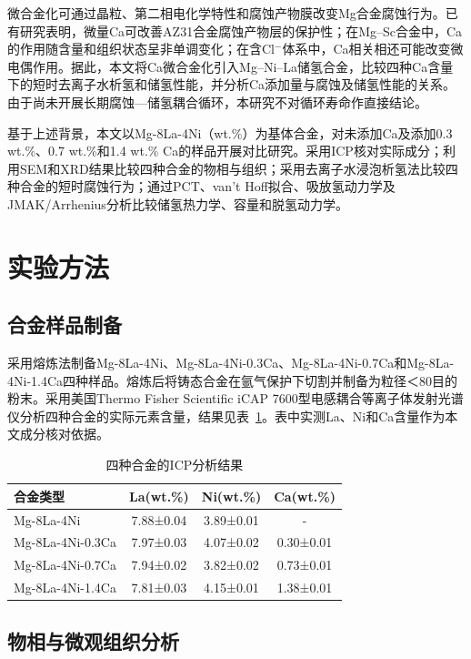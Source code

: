 \documentclass[preprint,12pt]{elsarticle}
\begin{document}
微合金化可通过晶粒、第二相电化学特性和腐蚀产物膜改变Mg合金腐蚀行为。已有研究表明，微量Ca可改善AZ31合金腐蚀产物层的保护性\cite{ref6}；在Mg–Sc合金中，Ca的作用随含量和组织状态呈非单调变化\cite{ref7}；在含Cl$^-$体系中，Ca相关相还可能改变微电偶作用\cite{ref8}。据此，本文将Ca微合金化引入Mg–Ni–La储氢合金，比较四种Ca含量下的短时去离子水析氢和储氢性能，并分析Ca添加量与腐蚀及储氢性能的关系。由于尚未开展长期腐蚀—储氢耦合循环，本研究不对循环寿命作直接结论。

基于上述背景，本文以Mg-8La-4Ni（wt.\%）为基体合金，对未添加Ca及添加0.3 wt.\%、0.7 wt.\%和1.4 wt.\% Ca的样品开展对比研究。采用ICP核对实际成分；利用SEM和XRD结果比较四种合金的物相与组织；采用去离子水浸泡析氢法比较四种合金的短时腐蚀行为；通过PCT、van’t Hoff拟合、吸放氢动力学及JMAK/Arrhenius分析比较储氢热力学、容量和脱氢动力学。

\section{实验方法}

\subsection{合金样品制备}

采用熔炼法制备Mg-8La-4Ni、Mg-8La-4Ni-0.3Ca、Mg-8La-4Ni-0.7Ca和Mg-8La-4Ni-1.4Ca四种样品。熔炼后将铸态合金在氩气保护下切割并制备为粒径＜80目的粉末。采用美国Thermo Fisher Scientific iCAP 7600型电感耦合等离子体发射光谱仪分析四种合金的实际元素含量，结果见表~\ref{tab:1}。表中实测La、Ni和Ca含量作为本文成分核对依据。

\begin{table}[htbp]
\centering
\caption{四种合金的ICP分析结果}
\label{tab:1}
\begingroup\fontsize{8}{10}\selectfont
\setlength{\tabcolsep}{3pt}
\begin{tabular}{@{}lccc@{}}
\toprule
合金类型 & La(wt.\%) & Ni(wt.\%) & Ca(wt.\%) \\
\midrule
Mg-8La-4Ni & 7.88±0.04 & 3.89±0.01 & - \\
Mg-8La-4Ni-0.3Ca & 7.97±0.03 & 4.07±0.02 & 0.30±0.01 \\
Mg-8La-4Ni-0.7Ca & 7.94±0.02 & 3.82±0.02 & 0.73±0.01 \\
Mg-8La-4Ni-1.4Ca & 7.81±0.03 & 4.15±0.01 & 1.38±0.01 \\
\bottomrule
\end{tabular}
\endgroup
\end{table}

\subsection{物相与微观组织分析}
\end{document}
